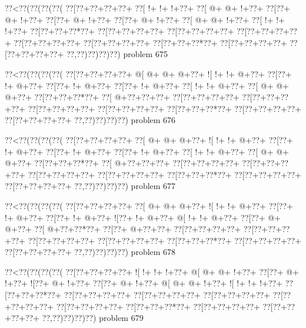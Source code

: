 \vbox{\vbox{\goo
\0??<\0??(\0??(\0??(\0??(
\0??[\0??+\0??+\0??+\0??+
\0??[\- !+\- !+\- !+\0??+
\0??[\- @+\- @+\- !+\0??+
\0??[\0??+\- @+\- !+\0??+
\0??[\0??+\- @+\- !+\0??+
\0??[\0??+\- @+\- !+\0??+
\0??[\- @+\- @+\- !+\0??+
\0??[\- !+\- !+\- !+\0??+
\0??[\0??+\0??+\0??*\0??+
\0??[\0??+\0??+\0??+\0??+
\0??[\0??+\0??+\0??+\0??+
\0??[\0??+\0??+\0??+\0??+
\0??[\0??+\0??+\0??+\0??+
\0??[\0??+\0??+\0??+\0??+
\0??[\0??+\0??+\0??*\0??+
\0??[\0??+\0??+\0??+\0??+
\0??[\0??+\0??+\0??+\0??+
\0??,\0??)\0??)\0??)\0??)
}
\hfil problem 675\hfil\break
}

\vbox{\vbox{\goo
\0??<\0??(\0??(\0??(\0??(
\0??[\0??+\0??+\0??+\0??+
\- @[\- @+\- @+\- @+\0??+
\- ![\- !+\- !+\- @+\0??+
\0??[\0??+\- !+\- @+\0??+
\0??[\0??+\- !+\- @+\0??+
\0??[\0??+\- !+\- @+\0??+
\0??[\- !+\- !+\- @+\0??+
\0??[\- @+\- @+\- @+\0??+
\0??[\0??+\0??+\0??*\0??+
\0??[\- @+\0??+\0??+\0??+
\0??[\0??+\0??+\0??+\0??+
\0??[\0??+\0??+\0??+\0??+
\0??[\0??+\0??+\0??+\0??+
\0??[\0??+\0??+\0??+\0??+
\0??[\0??+\0??+\0??*\0??+
\0??[\0??+\0??+\0??+\0??+
\0??[\0??+\0??+\0??+\0??+
\0??,\0??)\0??)\0??)\0??)
}
\hfil problem 676\hfil\break
}

\vbox{\vbox{\goo
\0??<\0??(\0??(\0??(\0??(
\0??[\0??+\0??+\0??+\0??+
\0??[\- @+\- @+\- @+\0??+
\- ![\- !+\- !+\- @+\0??+
\0??[\0??+\- !+\- @+\0??+
\0??[\0??+\- !+\- @+\0??+
\0??[\0??+\- !+\- @+\0??+
\0??[\- !+\- !+\- @+\0??+
\0??[\- @+\- @+\- @+\0??+
\0??[\0??+\0??+\0??*\0??+
\0??[\- @+\0??+\0??+\0??+
\0??[\0??+\0??+\0??+\0??+
\0??[\0??+\0??+\0??+\0??+
\0??[\0??+\0??+\0??+\0??+
\0??[\0??+\0??+\0??+\0??+
\0??[\0??+\0??+\0??*\0??+
\0??[\0??+\0??+\0??+\0??+
\0??[\0??+\0??+\0??+\0??+
\0??,\0??)\0??)\0??)\0??)
}
\hfil problem 677\hfil\break
}

\vbox{\vbox{\goo
\0??<\0??(\0??(\0??(\0??(
\0??[\0??+\0??+\0??+\0??+
\0??[\- @+\- @+\- @+\0??+
\- ![\- !+\- !+\- @+\0??+
\0??[\0??+\- !+\- @+\0??+
\0??[\0??+\- !+\- @+\0??+
\- ![\0??+\- !+\- @+\0??+
\- @[\- !+\- !+\- @+\0??+
\0??[\0??+\- @+\- @+\0??+
\0??[\- @+\0??+\0??*\0??+
\0??[\0??+\- @+\0??+\0??+
\0??[\0??+\0??+\0??+\0??+
\0??[\0??+\0??+\0??+\0??+
\0??[\0??+\0??+\0??+\0??+
\0??[\0??+\0??+\0??+\0??+
\0??[\0??+\0??+\0??*\0??+
\0??[\0??+\0??+\0??+\0??+
\0??[\0??+\0??+\0??+\0??+
\0??,\0??)\0??)\0??)\0??)
}
\hfil problem 678\hfil\break
}

\vbox{\vbox{\goo
\0??<\0??(\0??(\0??(\0??(
\0??[\0??+\0??+\0??+\0??+
\- ![\- !+\- !+\- !+\0??+
\- @[\- @+\- @+\- !+\0??+
\0??[\0??+\- @+\- !+\0??+
\- ![\0??+\- @+\- !+\0??+
\0??[\0??+\- @+\- !+\0??+
\- @[\- @+\- @+\- !+\0??+
\- ![\- !+\- !+\- !+\0??+
\0??[\0??+\0??+\0??*\0??+
\0??[\0??+\0??+\0??+\0??+
\0??[\0??+\0??+\0??+\0??+
\0??[\0??+\0??+\0??+\0??+
\0??[\0??+\0??+\0??+\0??+
\0??[\0??+\0??+\0??+\0??+
\0??[\0??+\0??+\0??*\0??+
\0??[\0??+\0??+\0??+\0??+
\0??[\0??+\0??+\0??+\0??+
\0??,\0??)\0??)\0??)\0??)
}
\hfil problem 679\hfil\break
}


